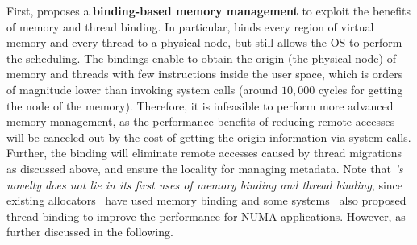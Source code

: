 First, \NM{} proposes a \textbf{binding-based memory management} to exploit the benefits of memory and thread binding. In particular, \NM{} binds every region of virtual memory and every thread to a physical node, but still allows the OS to perform the scheduling. 
The bindings enable \NM{} to obtain the origin (the physical node) of memory and threads with few instructions inside the user space, which is orders of magnitude lower than invoking system calls (around  $10,000$ cycles for getting the node of the memory). Therefore, it is infeasible to perform more advanced memory management, as the performance benefits of reducing remote accesses will be canceled out by the cost of getting the origin information via system calls.
Further, the binding will eliminate remote accesses caused by thread migrations as discussed above, and ensure the locality for managing metadata.  Note that \textit{\NM{}'s novelty does not lie in its first uses of memory binding and thread binding}, since existing allocators~\cite{tcmallocnew, mimalloc} have used memory binding and some systems~\cite{li2013numa, XuNuma, Lepers:2015:TMP:2813767.2813788} also proposed thread binding to improve the performance for NUMA applications. However,  as further discussed in the following.  
